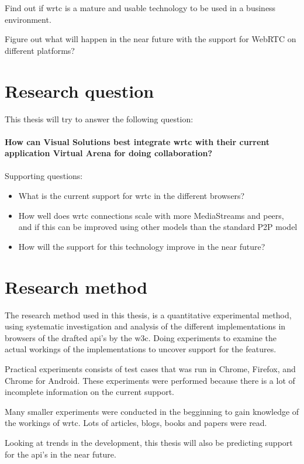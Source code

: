 Find out if \gls{wrtc} is a mature and usable technology to be used in a business environment.

Figure out what will happen in the near future with the support for WebRTC on different platforms?


\section{Research question}
This thesis will try to answer the following question:
\\
\\
\textbf{How can Visual Solutions best integrate \gls{wrtc} with their current application Virtual Arena for doing collaboration?}
\\
\\
Supporting questions:

\begin{itemize}
    \item What is the current support for \gls{wrtc} in the different browsers?
    \item How well does \gls{wrtc} connections scale with more MediaStreams and peers, and if this can be improved using other models than the standard P2P model
    \item How will the support for this technology improve in the near future?
\end{itemize}


\section{Research method}
The research method used in this thesis, is a quantitative experimental method, using systematic investigation and analysis of the different implementations in browsers of the drafted \gls{api}'s by the \gls{w3c}. Doing experiments to examine the actual workings of the implementations to uncover support for the features.

Practical experiments consists of test cases that was run in Chrome, Firefox, and Chrome for Android. These experiments were performed because there is a lot of incomplete information on the current support.

Many smaller experiments were conducted in the begginning to gain knowledge of the workings of \gls{wrtc}. Lots of articles, blogs, books and papers were read.

Looking at trends in the development, this thesis will also be predicting support for the \gls{api}'s in the near future. 


